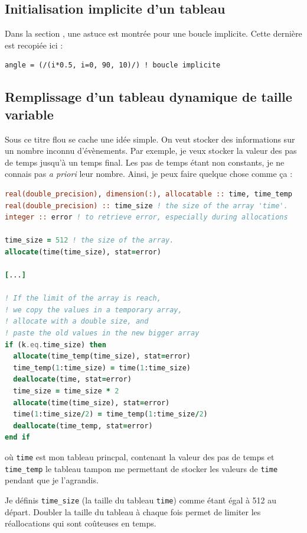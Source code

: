 \documentclass[a4paper,twoside]{article}
\begin{document}
\subsection{Initialisation implicite d'un tableau}
Dans la section , une astuce est montrée pour une boucle implicite. Cette dernière est recopiée ici : 
\begin{verbatim}
angle = (/(i*0.5, i=0, 90, 10)/) ! boucle implicite
\end{verbatim}

\subsection{Remplissage d'un tableau dynamique de taille variable}
Sous ce titre flou se cache une idée simple. On veut stocker des informations sur un nombre inconnu d'évènements. Par exemple, je veux stocker la valeur des pas de temps jusqu'à un temps final. Les pas de temps étant non constants, je ne connais pas \emph{a priori} leur nombre. Ainsi, je peux faire quelque chose comme ça : 
\begin{lstlisting}[language=Fortran]
real(double_precision), dimension(:), allocatable :: time, time_temp
real(double_precision) :: time_size ! the size of the array 'time'. 
integer :: error ! to retrieve error, especially during allocations

time_size = 512 ! the size of the array. 
allocate(time(time_size), stat=error)

[...]

! If the limit of the array is reach, 
! we copy the values in a temporary array, 
! allocate with a double size, and 
! paste the old values in the new bigger array
if (k.eq.time_size) then
  allocate(time_temp(time_size), stat=error)
  time_temp(1:time_size) = time(1:time_size)
  deallocate(time, stat=error)
  time_size = time_size * 2
  allocate(time(time_size), stat=error)
  time(1:time_size/2) = time_temp(1:time_size/2)
  deallocate(time_temp, stat=error)
end if
\end{lstlisting}
où \texttt{time} est mon tableau princpal, contenant la valeur des pas de temps et \texttt{time\_temp} le tableau tampon me permettant de stocker les valeurs de \texttt{time} pendant que je l'agrandis.

Je définis \texttt{time\_size} (la taille du tableau \texttt{time}) comme étant égal à 512 au départ. Doubler la taille du tableau à chaque fois permet de limiter les réallocations qui sont coûteuses en temps. 
\end{document}
